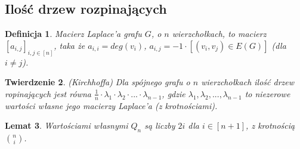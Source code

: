 \documentclass{pracamgr}
\newtheorem{theorem}{Twierdzenie}[chapter]
\newtheorem{defi}[theorem]{Definicja} %
\newtheorem{lemma}[theorem]{Lemat}
\begin{document}
   \subsection{Ilość drzew rozpinających}
    \begin{defi}
     Macierz Laplace'a grafu $G$, o $n$ wierzchołkach, to macierz $[a_{i,j}]_{i,j\in[n]}$, taka że\newline
     $a_{i,i}=deg(v_i)$, $a_{i,j}=-1\cdot [(v_i,v_j)\in E(G)]$ (dla $i\neq j$).
    \end{defi}
    \begin{theorem}\label{Kirchhoff}
     (Kirchhoffa)\newline
     Dla spójnego grafu o $n$ wierzchołkach ilość drzew ropinających jest równa $\frac{1}{n}\cdot\lambda_1\cdot\lambda_2\cdot...\cdot\lambda_{n-1}$,
     gdzie $\lambda_1,\lambda_2,...,\lambda_{n-1}$ to niezerowe wartości własne jego macierzy Laplace'a (z krotnościami).
    \end{theorem}
    \begin{lemma}
     Wartościami własnymi $Q_n$ są liczby $2i$ dla $i\in[n+1]$, z krotnością ${n\choose i}$.
    \end{lemma}
\end{document}
